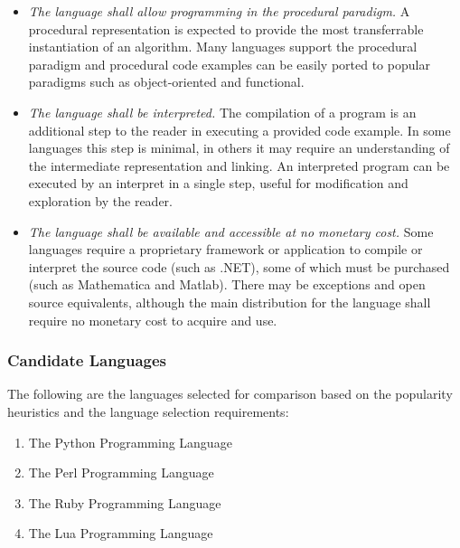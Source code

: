 \documentclass[a4paper, 11pt]{article}
\begin{document}
\begin{itemize}
	\item \emph{The language shall allow programming in the procedural paradigm.} A procedural representation is expected to provide the most transferrable instantiation of an algorithm. Many languages support the procedural paradigm and procedural code examples can be easily ported to popular paradigms such as object-oriented and functional.
	\item \emph{The language shall be interpreted.} The compilation of a program is an additional step to the reader in executing a provided code example. In some languages this step is minimal, in others it may require an understanding of the intermediate representation and linking. An interpreted program can be executed by an interpret in a single step, useful for modification and exploration by the reader.
	\item \emph{The language shall be available and accessible at no monetary cost.} Some languages require a proprietary framework or application to compile or interpret the source code (such as .NET), some of which must be purchased (such as Mathematica and Matlab). There may be exceptions and open source equivalents, although the main distribution for the language shall require no monetary cost to acquire and use.
\end{itemize}

% 
% 
\subsubsection{Candidate Languages}
\label{subsubsec:selection}
The following are the languages selected for comparison based on the popularity heuristics and the language selection requirements:
\begin{enumerate}
	\item The Python Programming Language
	\item The Perl Programming Language
	\item The Ruby Programming Language
	\item The Lua Programming Language
\end{enumerate}
\end{document}
